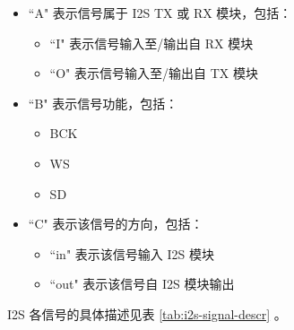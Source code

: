 \documentclass[main\_\_CN.tex]{subfiles}
\begin{document}
\begin{itemize}
    \item ``A" 表示信号属于 I2S TX 或 RX 模块，包括：
    \begin{itemize}
        \item ``I" 表示信号输入至/输出自 RX 模块
        \item ``O" 表示信号输入至/输出自 TX 模块
    \end{itemize}
    \item ``B" 表示信号功能，包括：
    \begin{itemize}
        \item BCK
        \item WS
        \item SD
    \end{itemize}
    \item ``C" 表示该信号的方向，包括：
    \begin{itemize}
        \item ``in" 表示该信号输入 I2S 模块
        \item ``out" 表示该信号自 I2S 模块输出
    \end{itemize}
\end{itemize}

I2S 各信号的具体描述见表 \ref{tab:i2s-signal-descr} \textit{}。
\end{document}
